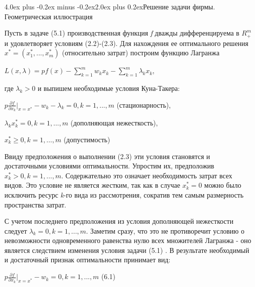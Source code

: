 \documentclass[12pt, 4paper]{book}
\makeatletter
\renewcommand{\section}{\@startsection{section}{1}{1pt}%
	{4.0ex plus -0.2ex minus -0.2ex}{2.0ex plus 0.2ex}{\centering\bf}}%
\makeatother
\begin{document}
{\begin{center}
\section{Решение задачи фирмы. Геометрическая иллюстрация}
\end{center}
\par

Пусть в задаче (5.1) производственная функция \textit{f} дважды дифференцируема в $R_{+}^{m}$ и удовлетворяет условиям (2.2)-(2.3). Для нахождения ее оптимального решения $x^{*}=(x_{1}^{*},...,x_{m}^{*})$ (относительно затрат) построим функцию Лагранжа 
\begin{center}
$L(x,\lambda)=pf(x) - \sum\limits_{k=1}^{m}w_k x_k - \sum\limits_{k=1}^{m} \lambda_k x_k$,
\end{center}
где $\lambda_k > 0$ и выпишем необходимые условия Куна-Такера:
\begin{center}
$p \frac{\partial f}{\partial x_k}|_{x = x^{*}} - w_k - \lambda_k = 0,k=1,...,m$ (стационарность),
\end{center}
\begin{center}
$\lambda_k x_{k}^{*} = 0, k = 1,...,m$ (дополняющая нежесткость),
\end{center}
\begin{center}
$x_{k}^{*} \geq 0 , k=1,...,m$ (допустимость)
\end{center}
\par

Ввиду предположения о выполнении (2.3) эти условия становятся и достаточными условиями оптимальности. Упростим их, предположив $x_{k}^{*} > 0, k=1,...,m$. Содержательно это означает необходимость затрат всех видов. Это условие не является жестким, так как в случае $x_{k}^{*} = 0$ можно было исключить ресурс \textit{k}-го вида из рассмотрения, сократив тем самым размерность пространства затрат. 
\par

С учетом последнего предположения из условия дополняющей нежесткости следует $\lambda_k = 0,k=1,...,m$. Заметим сразу, что это не противоречит условию о невозможности одновременного равенства нулю всех множителей Лагранжа - оно является следствием изменения условия задачи (5.1) . В результате необходимый и достаточный признак оптимальности принимает вид: 
\begin{center}
$p\frac{\partial f}{\partial x_k}|_{x=x^{*}} - w_k = 0 ,k=1,...,m$ (6.1)
\end{center}
\par

}
\end{document}
